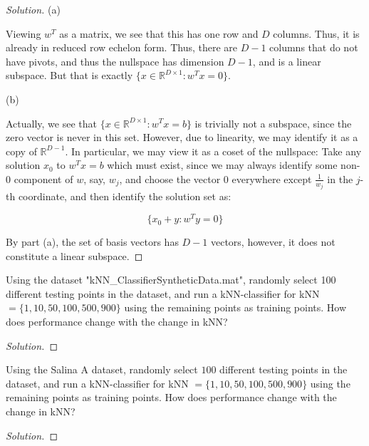 \documentclass[10pt]{article}
\newenvironment{problem}[2][]{\begin{trivlist}
\item[\hskip \labelsep {\bfseries #1}\hskip \labelsep {\bfseries #2.}]}{\end{trivlist}}
\begin{document}
\begin{proof}[Solution]

(a)

Viewing $w^T$ as a matrix, we see that this has one row and $D$ columns. Thus, it is already in reduced row echelon form. Thus, there are $D-1$ columns that do not have pivots, and thus the nullspace has dimension $D-1$, and is a linear subspace. But that is exactly $\{ x \in \mathbb{R}^{D \times 1} : w^T x = 0 \}$.

(b)

Actually, we see that  $\{ x \in \mathbb{R}^{D \times 1} : w^T x = b \}$ is trivially not a subspace, since the zero vector is never in this set. However, due to linearity, we may identify it as a copy of $\mathbb{R}^{D-1}$. In particular, we may view it as a coset of the nullspace: Take any solution $x_0$ to $w^Tx = b$ which must exist, since we may always identify some non-0 component of $w$, say, $w_j$, and choose the vector 0 everywhere except $\frac{1}{w_j}$ in the $j$-th coordinate, and then identify the solution set as:

$$\{  x_0 + y : w^T y = 0 \}$$

By part (a), the set of basis vectors has $D-1$ vectors, however, it does not constitute a linear subspace.



\end{proof}

\begin{problem}{Question 3}

Using the dataset "kNN\_ClassifierSyntheticData.mat", randomly select 100 different testing points in the dataset, and run a kNN-classifier for kNN $= \{ 1,10,50,100,500,900 \}$ using the remaining points as training points. How does performance change with the change in kNN?

\end{problem}

\begin{proof}[Solution]


\end{proof}

\begin{problem}{Question 4}

Using the Salina A dataset, randomly select $100$ different testing points in the dataset, and run a kNN-classifier for kNN $= \{ 1,10,50,100,500,900 \}$ using the remaining points as training points. How does performance change with the change in kNN?


\end{problem}

\begin{proof}[Solution]


\end{proof}
\end{document}
